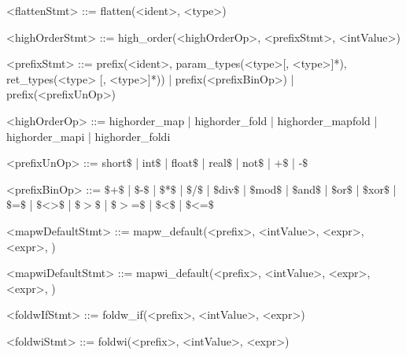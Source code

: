\documentclass{article}
\begin{document}
\begin{grammar}
<flattenStmt> ::= flatten(<ident>, <type>)

<highOrderStmt> ::= high_order(<highOrderOp>, <prefixStmt>, <intValue>)

<prefixStmt> ::= prefix(<ident>, param_types(<type>[, <type>]*), ret_types(<type> [, <type>]*)) |
                 prefix(<prefixBinOp>) | prefix(<prefixUnOp>)


<highOrderOp> ::= highorder_map | highorder_fold | highorder_mapfold |
                  highorder_mapi | highorder_foldi

<prefixUnOp> ::= short\(\$\) | int\(\$\) | float\(\$\) | real\(\$\) | not\(\$\) | +\(\$\) | -\(\$\)

<prefixBinOp> ::= \(\$\)+\(\$\) | \(\$\)-\(\$\) | \(\$\)*\(\$\) | \(\$\)/\(\$\) |
                  \(\$\)div\(\$\) | \(\$\)mod\(\$\) | \(\$\)and\(\$\) | \(\$\)or\(\$\) | \(\$\)xor\(\$\) |
                  \(\$\)=\(\$\) | \(\$\)<>\(\$\) | \(\$\)\(>\)\(\$\) | \(\$\)\(>\)=\(\$\) | \(\$\)\textless\(\$\) | \(\$\)\textless=\(\$\)

<mapwDefaultStmt> ::= mapw_default(<prefix>, <intValue>, <expr>, <expr>, )

<mapwiDefaultStmt> ::= mapwi_default(<prefix>, <intValue>, <expr>, <expr>, )

<foldwIfStmt> ::= foldw_if(<prefix>, <intValue>, <expr>)

<foldwiStmt> ::= foldwi(<prefix>, <intValue>, <expr>)

\end{grammar}
\end{document}
